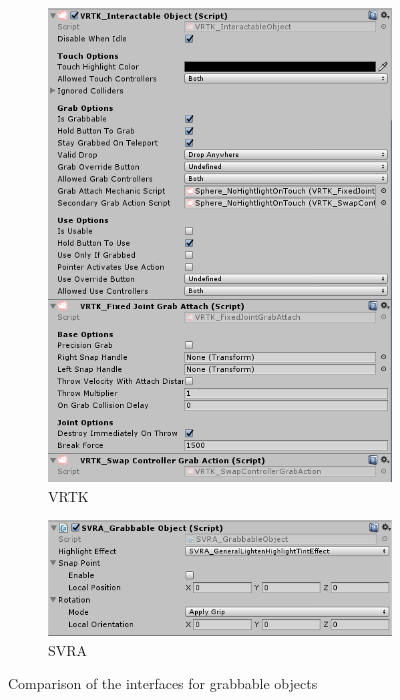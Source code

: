 \documentclass{l4proj}
\begin{document}
\begin{figure}[h]
\begin{subfigure}[h]{0.3\linewidth}
\includegraphics[width=\linewidth]{dissertation/vrtk_object.png}
\caption{VRTK}
\end{subfigure}
\hfill
\begin{subfigure}[h]{0.3\linewidth}
\includegraphics[width=\linewidth]{dissertation/svra_grab_object.png}
\caption{SVRA}
\end{subfigure}
\caption{Comparison of the interfaces for grabbable objects}
\end{figure}
\end{document}
